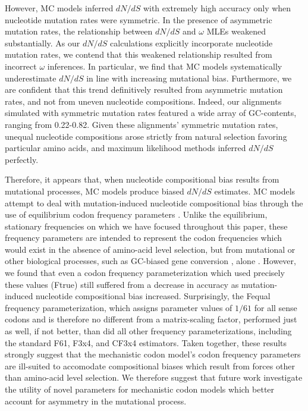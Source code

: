 \documentclass{pnastwo}
\begin{document}
\begin{article}
However, MC models inferred $dN/dS$ with extremely high accuracy only when nucleotide mutation rates were symmetric. In the presence of asymmetric mutation rates, the relationship between $dN/dS$ and $\omega$ MLEs weakened substantially. As our $dN/dS$ calculations explicitly incorporate nucleotide mutation rates, we contend that this weakened relationship resulted from incorrect $\omega$ inferences. In particular, we find that MC models systematically underestimate $dN/dS$ in line with increasing mutational bias. Furthermore, we are confident that this trend definitively resulted from asymmetric mutation rates, and not from uneven nucleotide compositions. Indeed, our alignments simulated with symmetric mutation rates featured a wide array of GC-contents, ranging from 0.22-0.82. Given these alignments' symmetric mutation rates, unequal nucleotide compositions arose strictly from natural selection favoring particular amino acids, and maximum likelihood methods inferred $dN/dS$ perfectly.

Therefore, it appears that, when nucleotide compositional bias results from mutational processes, MC models produce biased $dN/dS$ estimates. MC models attempt to deal with mutation-induced nucleotide compositional bias through the use of equilibrium codon frequency parameters \cite{Yang2006}. Unlike the equilibrium, stationary frequencies on which we have focused throughout this paper, these frequency parameters are intended to represent the codon frequencies which would exist in the absence of amino-acid level selection, but from mutational or other biological processes, such as GC-biased gene conversion \cite{DuretGaltier2009,WebsterHurst2012}, alone \cite{GoldmanYang1994,MuseGaut1994,YN00,Yang2006}. 
However, we found that even a codon frequency parameterization which used precisely these values (Ftrue) still suffered from a decrease in accuracy as mutation-induced nucleotide compositional bias increased. Surprisingly, the Fequal frequency parameterization, which assigns parameter values of $1/61$ for all sense codons and is therefore no different from a matrix-scaling factor, performed just as well, if not better, than did all other frequency parameterizations, including the standard F61, F3x4, and CF3x4 estimators. Taken together, these results strongly suggest that the mechanistic codon model's codon frequency parameters are ill-suited to accomodate compositional biases which result from forces other than amino-acid level selection. We therefore suggest that future work investigate the utility of novel parameters for mechanistic codon models which better account for asymmetry in the mutational process.



\end{article}
\end{document}
